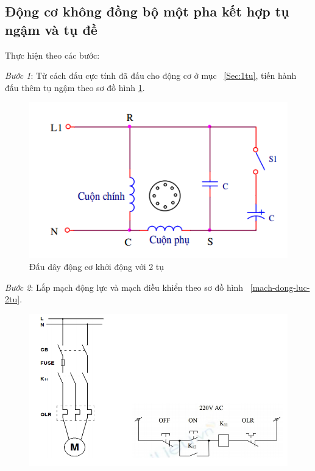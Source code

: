 \documentclass[13pt,a4paper]{extarticle}
\begin{document}
\subsection{Động cơ không đồng bộ một pha kết hợp tụ ngậm và tụ đề}
Thực hiện theo các bước:
\begin{list}{--}{}
\item \textit{Bước 1}: Từ cách đấu cực tính đã đấu cho động cơ ở mục ~\ref{Sec:1tu}, tiến hành đấu thêm tụ ngậm theo sơ đồ hình \ref{khoi-dong-2tu}.
\begin{figure}[!h]
\begin{center}
\includegraphics[scale=.4]{khoi-dong-2tu}
\end{center}
\caption{Đấu dây động cơ khởi động với 2 tụ}\label{khoi-dong-2tu}
\end{figure}
\item \textit{Bước 2}: Lắp mạch động lực và mạch điều khiển theo sơ đồ hình ~\ref{mach-dong-luc-2tu}.
\begin{figure}[!h]
\begin{center}
\includegraphics[scale=.6]{mach-dluc-dkhien}
\end{center}

\end{figure}
\end{list}
\end{document}
